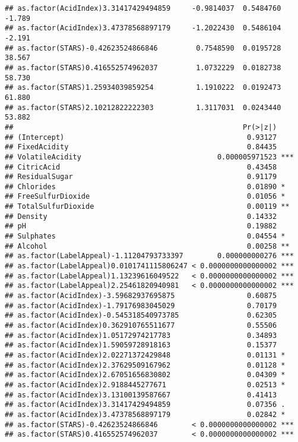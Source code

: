\documentclass[
]{article}
\begin{document}
\begin{verbatim}
## as.factor(AcidIndex)3.31417429494859     -0.9814037  0.5484760  -1.789
## as.factor(AcidIndex)3.47378568897179     -1.2022430  0.5486104  -2.191
## as.factor(STARS)-0.42623524866846         0.7548590  0.0195728  38.567
## as.factor(STARS)0.416552574962037         1.0732229  0.0182738  58.730
## as.factor(STARS)1.25934039859254          1.1910222  0.0192473  61.880
## as.factor(STARS)2.10212822222303          1.3117031  0.0243440  53.882
##                                                      Pr(>|z|)    
## (Intercept)                                           0.93127    
## FixedAcidity                                          0.84435    
## VolatileAcidity                                0.000005971523 ***
## CitricAcid                                            0.43458    
## ResidualSugar                                         0.91179    
## Chlorides                                             0.01890 *  
## FreeSulfurDioxide                                     0.01056 *  
## TotalSulfurDioxide                                    0.00119 ** 
## Density                                               0.14332    
## pH                                                    0.19882    
## Sulphates                                             0.04554 *  
## Alcohol                                               0.00258 ** 
## as.factor(LabelAppeal)-1.11204793733397        0.000000000276 ***
## as.factor(LabelAppeal)0.0101741115806247 < 0.0000000000000002 ***
## as.factor(LabelAppeal)1.13239616049522   < 0.0000000000000002 ***
## as.factor(LabelAppeal)2.25461820940981   < 0.0000000000000002 ***
## as.factor(AcidIndex)-3.59682937695875                 0.60875    
## as.factor(AcidIndex)-1.79176983045029                 0.70179    
## as.factor(AcidIndex)-0.545318540973785                0.62305    
## as.factor(AcidIndex)0.362910765511677                 0.55506    
## as.factor(AcidIndex)1.05172974217783                  0.34893    
## as.factor(AcidIndex)1.59059728918163                  0.15377    
## as.factor(AcidIndex)2.02271372429848                  0.01131 *  
## as.factor(AcidIndex)2.37629509167962                  0.01128 *  
## as.factor(AcidIndex)2.67051656830802                  0.04309 *  
## as.factor(AcidIndex)2.9188445277671                   0.02513 *  
## as.factor(AcidIndex)3.13100139587667                  0.41413    
## as.factor(AcidIndex)3.31417429494859                  0.07356 .  
## as.factor(AcidIndex)3.47378568897179                  0.02842 *  
## as.factor(STARS)-0.42623524866846        < 0.0000000000000002 ***
## as.factor(STARS)0.416552574962037        < 0.0000000000000002 ***

\end{verbatim}
\end{document}
